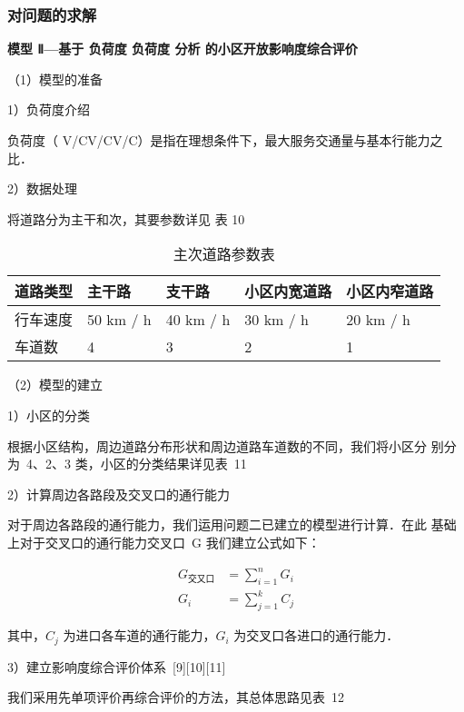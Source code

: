 \subsubsection{对问题的求解}

\textbf{模型 Ⅱ—基于 负荷度 负荷度 分析 的小区开放影响度综合评价}

（1）模型的准备

1）负荷度介绍

负荷度（ V/CV/CV/C）是指在理想条件下，最大服务交通量与基本行能力之比．

2）数据处理

将道路分为主干和次，其要参数详见 表 10

\begin{table*}[h!]
  \centering
  \small
  \tabcolsep 2.5pt
  \caption{主次道路参数表}
\begin{tabular*}{0.8\linewidth}{p{60pt}<{\centering}p{60pt}<{\centering}
p{60pt}<{\centering}p{80pt}<{\centering}p{80pt}<{\centering}}
\toprule
  道路类型  &  主干路  &  支干路  &  小区内宽道路  &  小区内窄道路  \\
  \midrule
  行车速度  & 50 km / h & 40 km / h & 30 km / h & 20 km / h \\
 车道数  & 4 & 3 & 2 & 1 \\
\bottomrule
  \end{tabular*}
  \label{tab10}
\end{table*}

（2）模型的建立

1）小区的分类

根据小区结构，周边道路分布形状和周边道路车道数的不同，我们将小区分
别分为~4、2、3 类，小区的分类结果详见表~11


2）计算周边各路段及交叉口的通行能力

对于周边各路段的通行能力，我们运用问题二已建立的模型进行计算．在此
基础上对于交叉口的通行能力交叉口~G 我们建立公式如下：

\begin{align}
G_{\text{交又口}}& =\sum_{i=1}^{n} G_{i} \\
G_{i}& =\sum_{j=1}^{k} C_{j}
\end{align}


其中，$C_{j}$ 为进口各车道的通行能力，$ G_{i}$ 为交叉口各进口的通行能力．

3）建立影响度综合评价体系~[9][10][11]

我们采用先单项评价再综合评价的方法，其总体思路见表~12

